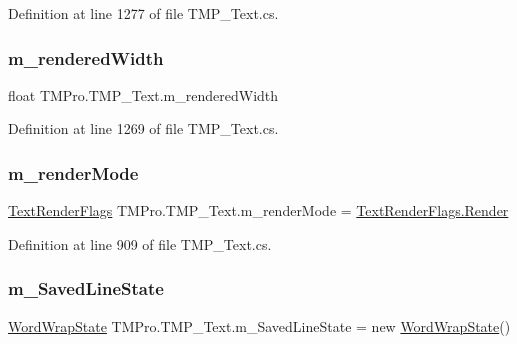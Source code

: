 Definition at line 1277 of file T\+M\+P\+\_\+\+Text.\+cs.

\mbox{\label{class_t_m_pro_1_1_t_m_p___text_ab71250a9179056a1992e026dd58ace09}} 
\subsubsection{\texorpdfstring{m\_renderedWidth}{m\_renderedWidth}}
{\footnotesize\ttfamily float T\+M\+Pro.\+T\+M\+P\+\_\+\+Text.\+m\+\_\+rendered\+Width\hspace{0.3cm}{\ttfamily [protected]}}



Definition at line 1269 of file T\+M\+P\+\_\+\+Text.\+cs.

\mbox{\label{class_t_m_pro_1_1_t_m_p___text_a55f026719f4c150e4350953a29a2f963}} 
\subsubsection{\texorpdfstring{m\_renderMode}{m\_renderMode}}
{\footnotesize\ttfamily \mbox{\hyperlink{namespace_t_m_pro_ac5a571bdd8e4873a73f2c05b62feff0e}{Text\+Render\+Flags}} T\+M\+Pro.\+T\+M\+P\+\_\+\+Text.\+m\+\_\+render\+Mode = \mbox{\hyperlink{namespace_t_m_pro_ac5a571bdd8e4873a73f2c05b62feff0ea5e520da5341f2fec6d3bbfe7ef357922}{Text\+Render\+Flags.\+Render}}\hspace{0.3cm}{\ttfamily [protected]}}



Definition at line 909 of file T\+M\+P\+\_\+\+Text.\+cs.

\mbox{\label{class_t_m_pro_1_1_t_m_p___text_ae4f41b6ef963688730471f426fbc96de}} 
\subsubsection{\texorpdfstring{m\_SavedLineState}{m\_SavedLineState}}
{\footnotesize\ttfamily \mbox{\hyperlink{struct_t_m_pro_1_1_word_wrap_state}{Word\+Wrap\+State}} T\+M\+Pro.\+T\+M\+P\+\_\+\+Text.\+m\+\_\+\+Saved\+Line\+State = new \mbox{\hyperlink{struct_t_m_pro_1_1_word_wrap_state}{Word\+Wrap\+State}}()\hspace{0.3cm}{\ttfamily [protected]}}




